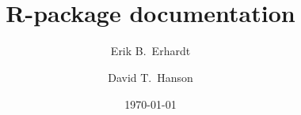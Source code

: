 






%



%



\frontmatter
\title{\tdllicor \\ R-package documentation}
\author{Erik B.\ Erhardt \and David T.\ Hanson}
\date{\today}


\mainmatter

\appendix   %
\backmatter



